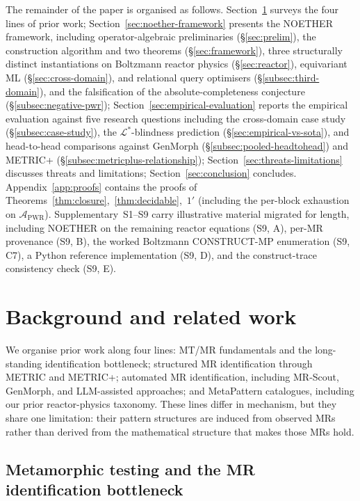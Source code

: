 \documentclass[acmsmall, screen]{acmart}
\begin{document}
The remainder of the paper is organised as follows. Section~\ref{sec:related} surveys the four lines of prior work; Section~\ref{sec:noether-framework} presents the NOETHER framework, including operator-algebraic preliminaries (\S\ref{sec:prelim}), the construction algorithm and two theorems (\S\ref{sec:framework}), three structurally distinct instantiations on Boltzmann reactor physics (\S\ref{sec:reactor}), equivariant ML (\S\ref{sec:cross-domain}), and relational query optimisers (\S\ref{subsec:third-domain}), and the falsification of the absolute-completeness conjecture (\S\ref{subsec:negative-pwr}); Section~\ref{sec:empirical-evaluation} reports the empirical evaluation against five research questions including the cross-domain case study (\S\ref{subsec:case-study}), the $\mathcal{L}^{*}$-blindness prediction (\S\ref{sec:empirical-vs-sota}), and head-to-head comparisons against GenMorph (\S\ref{subsec:pooled-headtohead}) and METRIC+ (\S\ref{subsec:metricplus-relationship}); Section~\ref{sec:threats-limitations} discusses threats and limitations; Section~\ref{sec:conclusion} concludes. Appendix~\ref{app:proofs} contains the proofs of Theorems~\ref{thm:closure},~\ref{thm:decidable},~$1'$ (including the per-block exhaustion on $\mathcal{A}_{\mathrm{PWR}}$). Supplementary~S1--S9 carry illustrative material migrated for length, including NOETHER on the remaining reactor equations (S9, A), per-MR provenance (S9, B), the worked Boltzmann CONSTRUCT-MP enumeration (S9, C7), a Python reference implementation (S9, D), and the construct-trace consistency check (S9, E).

\section{Background and related work}
\label{sec:related}

We organise prior work along four lines: MT/MR fundamentals and the long-standing identification bottleneck; structured MR identification through METRIC and METRIC+; automated MR identification, including MR-Scout, GenMorph, and LLM-assisted approaches; and MetaPattern catalogues, including our prior reactor-physics taxonomy. These lines differ in mechanism, but they share one limitation: their pattern structures are induced from observed MRs rather than derived from the mathematical structure that makes those MRs hold.

\subsection{Metamorphic testing and the MR identification bottleneck}
\end{document}
